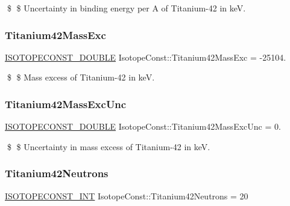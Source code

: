 \$ \$ Uncertainty in binding energy per A of Titanium-\/42 in keV. \mbox{\label{group___isotope_const-_titanium-_ti42_ga66ccd4264edc8a3109d5127057fa597f}} 
\subsubsection{\texorpdfstring{Titanium42\+Mass\+Exc}{Titanium42MassExc}}
{\footnotesize\ttfamily \mbox{\hyperlink{group___isotope_const-_macros_ga8f45a7272ce02c0b4c65c44636ed719a}{I\+S\+O\+T\+O\+P\+E\+C\+O\+N\+S\+T\+\_\+\+D\+O\+U\+B\+LE}} Isotope\+Const\+::\+Titanium42\+Mass\+Exc = -\/25104.}

\$ \$ Mass excess of Titanium-\/42 in keV. \mbox{\label{group___isotope_const-_titanium-_ti42_ga75c9084ff4f020548cc53b8bda52c4d2}} 
\subsubsection{\texorpdfstring{Titanium42\+Mass\+Exc\+Unc}{Titanium42MassExcUnc}}
{\footnotesize\ttfamily \mbox{\hyperlink{group___isotope_const-_macros_ga8f45a7272ce02c0b4c65c44636ed719a}{I\+S\+O\+T\+O\+P\+E\+C\+O\+N\+S\+T\+\_\+\+D\+O\+U\+B\+LE}} Isotope\+Const\+::\+Titanium42\+Mass\+Exc\+Unc = 0.}

\$ \$ Uncertainty in mass excess of Titanium-\/42 in keV. \mbox{\label{group___isotope_const-_titanium-_ti42_gad916e51dc7d781ff573ad4b2cfdb52b5}} 
\subsubsection{\texorpdfstring{Titanium42\+Neutrons}{Titanium42Neutrons}}
{\footnotesize\ttfamily \mbox{\hyperlink{group___isotope_const-_macros_ga5f18360b3e99483a35c32d789e62621c}{I\+S\+O\+T\+O\+P\+E\+C\+O\+N\+S\+T\+\_\+\+I\+NT}} Isotope\+Const\+::\+Titanium42\+Neutrons = 20}

